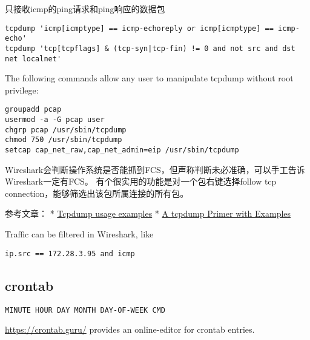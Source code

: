 只接收icmp的ping请求和ping响应的数据包
\begin{verbatim}
tcpdump 'icmp[icmptype] == icmp-echoreply or icmp[icmptype] == icmp-echo'
tcpdump 'tcp[tcpflags] & (tcp-syn|tcp-fin) != 0 and not src and dst net localnet'
\end{verbatim}

The following commands allow any user to manipulate tcpdump without root privilege:
\begin{verbatim}
groupadd pcap
usermod -a -G pcap user
chgrp pcap /usr/sbin/tcpdump
chmod 750 /usr/sbin/tcpdump
setcap cap_net_raw,cap_net_admin=eip /usr/sbin/tcpdump
\end{verbatim}


Wireshark会判断操作系统是否能抓到FCS，但声称判断未必准确，可以手工告诉Wireshark一定有FCS。
有个很实用的功能是对一个包右键选择follow tcp connection，能够筛选出该包所属连接的所有包。

 参考文章：
 * \href{http://www.rationallyparanoid.com/articles/tcpdump.html}{Tcpdump usage examples}
 * \href{https://danielmiessler.com/study/tcpdump/}{A tcpdump Primer with  Examples}

Traffic can be filtered in Wireshark, like
\begin{verbatim}
ip.src == 172.28.3.95 and icmp
\end{verbatim}

\subsection{crontab}

\begin{verbatim}
MINUTE HOUR DAY MONTH DAY-OF-WEEK CMD
\end{verbatim}

\url{https://crontab.guru/} provides an online-editor for crontab entries.

\clearpage




